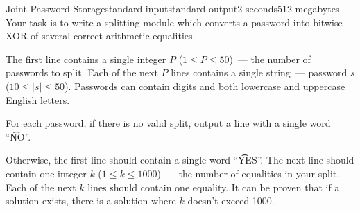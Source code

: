 \begin{problem}{Joint Password Storage}{standard input}{standard output}{2 seconds}{512 megabytes}
Your task is to write a splitting module which converts a password into bitwise XOR of several correct arithmetic equalities. 

\InputFile
The first line contains a single integer $P$ ($1 \le P \le 50$)~--- the number of passwords to split. 
Each of the next $P$ lines contains a single string~--- password $s$ ($10 \le |s| \le 50$). Passwords can contain digits and both lowercase and uppercase English letters. 

\OutputFile
For each password, if there is no valid split, output a line with a single word ``\t{NO}''.

Otherwise, the first line should contain a single word ``\t{YES}''. The next line should contain one integer $k$ ($1 \le k \le 1000$)~--- the number of equalities in your split. Each of the next $k$ lines should contain one equality. It can be proven that if a solution exists, there is a solution where $k$ doesn't exceed 1000.

\Example

\begin{examplewide}
%
\end{examplewide}

\end{problem}

